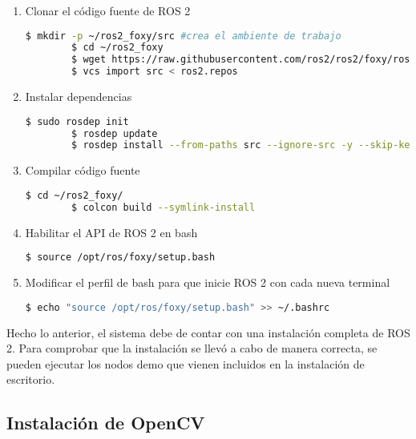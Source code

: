 \begin{enumerate}
    \item Clonar el código fuente de ROS 2

    \begin{lstlisting}[language = bash]
        $ mkdir -p ~/ros2_foxy/src #crea el ambiente de trabajo
        $ cd ~/ros2_foxy
        $ wget https://raw.githubusercontent.com/ros2/ros2/foxy/ros2.repos
        $ vcs import src < ros2.repos
    \end{lstlisting}

    \item Instalar dependencias

    \begin{lstlisting}[language = bash]
        $ sudo rosdep init
        $ rosdep update
        $ rosdep install --from-paths src --ignore-src -y --skip-keys "fastcdr rti-connext-dds-5.3.1 urdfdom_headers"
    \end{lstlisting}

    \item Compilar código fuente
    
    \begin{lstlisting}[language = bash]
        $ cd ~/ros2_foxy/
        $ colcon build --symlink-install
    \end{lstlisting}

    \item Habilitar el API de ROS 2 en bash
    
    \begin{lstlisting}[language = bash]
        $ source /opt/ros/foxy/setup.bash
    \end{lstlisting}

    \item Modificar el perfil de bash para que inicie ROS 2 con cada nueva terminal
    
    \begin{lstlisting}[language = bash]
        $ echo "source /opt/ros/foxy/setup.bash" >> ~/.bashrc 
    \end{lstlisting}

\end{enumerate}

Hecho lo anterior, el sistema debe de contar con una instalación completa de ROS 2. Para comprobar que la instalación se llevó a cabo de manera correcta, se pueden ejecutar los nodos demo que vienen incluidos en la instalación de escritorio.

\subsection{Instalación de OpenCV}

